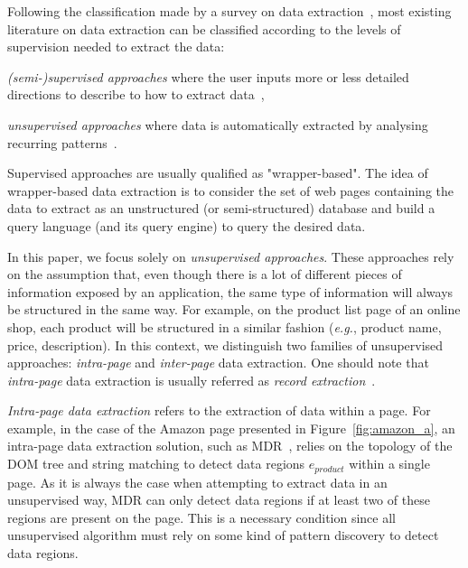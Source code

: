\documentclass[sigconf,authordraft]{acmart}
\theoremstyle{definition}
\begin{document}
Following the classification made by a survey on data extraction~\cite{Chang2006ASystems}, most existing literature on data extraction can be classified according to the levels of supervision needed to extract the data:
\begin{compactitem}
    \item \emph{(semi-)supervised approaches} where the user inputs more or less detailed directions to describe to how to extract data~\cite{Barish2000TheaterLoc:Applications,Huang2000ExtractingWEB,Levy1996QueryingDescriptions,Muslea1999ExtractionSurvey,Gottlob2004Logic-basedExtraction,Gottlob2004MonadicExtraction,Hsu1998GeneratingWeb},
    \item \emph{unsupervised approaches} where data is automatically extracted by analysing recurring patterns~\cite{Crescenzi2001RoadRunner:Sites,ArasuExtractingPages,Liu2003MiningPages,Wang2002WrapperDiscovery,Wang2002WrapperDiscovery}.
\end{compactitem}

Supervised approaches are usually qualified as "wrapper-based".
The idea of wrapper-based data extraction is to consider the set of web pages containing the data to extract as an unstructured (or semi-structured) database and build a query language (and its query engine) to query the desired data.

In this paper, we focus solely on \emph{unsupervised approaches}.
These approaches rely on the assumption that, even though there is a lot of different pieces of information exposed by an application, the same type of information will always be structured in the same way.
For example, on the product list page of an online shop, each product will be structured in a similar fashion (\emph{e.g.}, product name, price, description).
In this context, we distinguish two families of unsupervised approaches: \emph{intra-page} and \emph{inter-page} data extraction.
One should note that \emph{intra-page} data extraction is usually referred as \emph{record extraction}~\cite{Chang2006ASystems,DeReis2004AutomaticDistance}. 

\emph{Intra-page data extraction} refers to the extraction of data within a page.
For example, in the case of the Amazon page presented in Figure~\ref{fig:amazon_a}, an intra-page data extraction solution, such as MDR~\cite{Liu2003MiningPages}, relies on the topology of the DOM tree and string matching to detect data regions $\hat{e}_{product}$ within a single page.
As it is always the case when attempting to extract data in an unsupervised way, MDR can only detect data regions if at least two of these regions are present on the page.
This is a necessary condition since all unsupervised algorithm must rely on some kind of pattern discovery to detect data regions.
\end{document}
